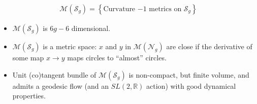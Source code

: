 \documentclass[8pt]{beamer}
\newcommand{\os}{\mathcal{S}}
\newcommand{\no}{\mathcal{N}}
\newcommand{\mg}{\mathcal{M}}
\begin{document}
\begin{frame}
  \begin{align*}
    \mg(\os_g) = \left\{ \text{Curvature $-1$ metrics on $\os_g$} \right\}
  \end{align*}
  \begin{itemize}
  \item<2-> $\mg(\os_g)$ is $6g-6$ dimensional.
  \item<3-> $\mg(\os_g)$ is a metric space: $x$ and $y$ in $\mg(\no_g)$ are close if the derivative of some map $x \to y$ maps circles to ``almost'' circles.
  \item<4-> Unit (co)tangent bundle of $\mg(\os_g)$ is non-compact, but finite volume, and admits a geodesic flow (and an $SL(2, \mathbb{R})$ action) with good dynamical properties.
  \end{itemize}
\end{frame}
\end{document}
